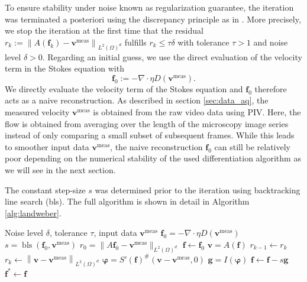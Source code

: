 \documentclass[final,leqno]{scrarticle}
\newcommand{\norm}[1]{\left\| #1 \right\|}
\newcommand{\lzd}{{L^2(\Omega)^d}}
\begin{document}
To ensure stability under noise known as regularization guarantee, the iteration was terminated a posteriori using the discrepancy principle as in \cite{Han95}. More precisely, we stop the iteration at the first time that the residual $r_k:=\norm{A(\mathbf{f}_k)-\mathbf{v}^{\text{meas}}}_\lzd$ fulfills $r_k \leq \tau \delta$ with tolerance $\tau>1$ and noise level $\delta>0$. 
Regarding an initial guess, we use the direct evaluation of the velocity term in the Stokes equation with
\begin{equation}
    \mathbf{f}_0:=- \nabla \cdot \eta D(\mathbf{v}^{\text{meas}}).
    \label{eq:f0}
\end{equation}
We directly evaluate the velocity term of the Stokes equation and $\mathbf{f}_0$ therefore acts as a naive reconstruction.
As described in section \ref{sec:data_aq}, the measured velocity  $\mathbf{v}^{\operatorname{meas}}$ is obtained from the raw video data using PIV. 
Here, the flow is obtained from averaging over the length of the microscopy image series instead of only comparing a small subset of subsequent frames. While this leads to smoother input data $\mathbf{v}^{\operatorname{meas}}$, the naive reconstruction $\mathbf{f}_0$ can still be relatively poor depending on the numerical stability of the used differentiation algorithm as we will see in the next section.

The constant step-size $s$ was determined prior to the iteration using backtracking line search (bls).
The full algorithm is shown in detail in Algorithm \ref{alg:landweber}.

\begin{algorithm}[H]
\caption{Landweber iteration}\label{alg:landweber}
\begin{algorithmic}
\Require Noise level $\delta$, tolerance $\tau$, input data $\mathbf{v}^{\operatorname{meas}}$
\State $\mathbf{f}_0 = - \nabla \cdot \eta D(\mathbf{v}^{\text{meas}})$
\State $s=\operatorname{bls}(\mathbf{f}_0,\mathbf{v}^\text{meas})$
\State $r_{0} = \|A\mathbf{f}_0-\mathbf{v}^\text{meas}\|_{\lzd}$
\State $\mathbf{f} \gets \mathbf{f}_0$
    \State $\mathbf{v} = A(\mathbf{f})$ 
    \State $r_{k-1}\gets r_k$
    \State $r_k \gets \norm{\mathbf{v}-\mathbf{v}^{\text{meas}}}_\lzd$
    \State $\boldsymbol{\varphi} = S'(\mathbf{f})^{\#}\left(\mathbf{v} - \mathbf{v}^{\text{meas}},0\right)$  
    \State $\mathbf{g} = I(\boldsymbol{\varphi})$ 
    \State $\mathbf{f} \gets \mathbf{f} - s \mathbf{g}$
\EndWhile
\State \Return $\mathbf{f}^* \gets \mathbf{f}$ 
\end{algorithmic}

\end{algorithm}
\end{document}
